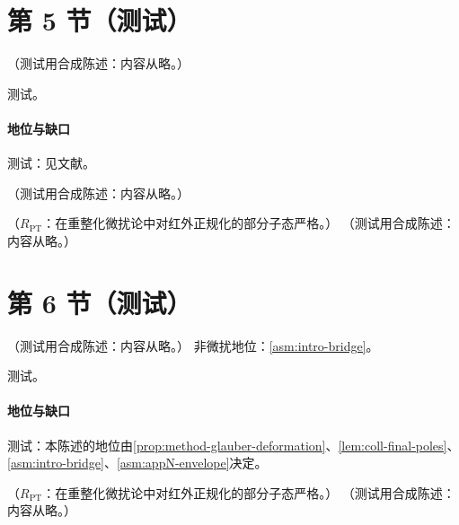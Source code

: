 \section{第 5 节（测试）}\label{sec:scet-glauber}

\begin{proposition}\label{prop:scet-glauber-operators}
（测试用合成陈述：内容从略。）
\end{proposition}
\begin{proofsketch}测试。\end{proofsketch}
\paragraph{地位与缺口}测试：见文献。

\begin{remark}\label{rem:scet-glauber-dictionary}
（测试用合成陈述：内容从略。）
\end{remark}

\begin{proposition}\label{prop:scet-hard-matching}
（$R_{\mathrm{PT}}$：在重整化微扰论中对红外正规化的部分子态严格。）
（测试用合成陈述：内容从略。）
\end{proposition}

\section{第 6 节（测试）}\label{sec:scet-thrust}

\begin{theorem}\label{thm:scet-thrust}
（测试用合成陈述：内容从略。）
非微扰地位：\cref{asm:intro-bridge}。
\end{theorem}
\begin{proofsketch}测试。\end{proofsketch}
\paragraph{地位与缺口}测试：本陈述的地位由\cref{prop:method-glauber-deformation}、\cref{lem:coll-final-poles}、\cref{asm:intro-bridge}、\cref{asm:appN-envelope}决定。

\begin{proposition}\label{prop:scet-thrust-oneloop}
（$R_{\mathrm{PT}}$：在重整化微扰论中对红外正规化的部分子态严格。）
（测试用合成陈述：内容从略。）
\end{proposition}

